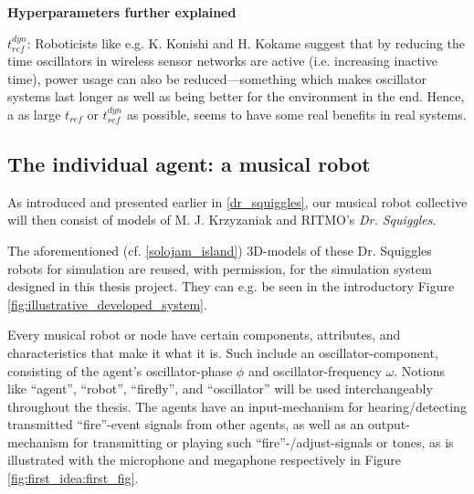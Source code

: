 	\textbf{Hyperparameters further explained} \nl
	
	\textbf{$t_{ref}^{dyn}$}: Roboticists like e.g. K. Konishi and H. Kokame \cite{konishi_kokame} suggest that by reducing the time oscillators in wireless sensor networks are active (i.e. increasing inactive time), power usage can also be reduced—something which makes oscillator systems last longer as well as being better for the environment in the end. Hence, a as large $t_{ref}$ or $t_{ref}^{dyn}$ as possible, seems to have some real benefits in real systems.
	

	\subsection{The individual agent: a musical robot}
	\label{subsec:agent}

	As introduced and presented earlier in \ref{dr_squiggles}, our musical robot collective will then consist of models of M. J. Krzyzaniak and RITMO's \textit{Dr. Squiggles}.
	
	The aforementioned (cf. \ref{solojam_island}) 3D-models of these Dr. Squiggles robots for simulation are reused, with permission, for the simulation system designed in this thesis project. They can e.g. be seen in the introductory Figure \ref{fig:illustrative_developed_system}.

	Every musical robot or node have certain components, attributes, and characteristics that make it what it is. Such include an oscillator-component, consisting of the agent's oscillator-phase $\phi$ and oscillator-frequency $\omega$. Notions like ``agent'', ``robot'', ``firefly'', and ``oscillator'' will be used interchangeably throughout the thesis. The agents have an input-mechanism for hearing/detecting transmitted ``fire''-event signals from other agents, as well as an output-mechanism for transmitting or playing such ``fire''-/adjust-signals or tones, as is illustrated with the microphone and megaphone respectively in Figure \ref{fig:first_idea:first_fig}.
	
